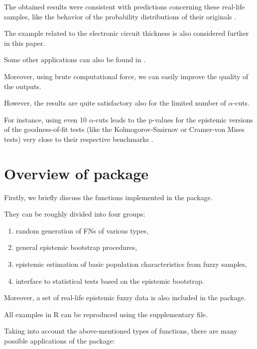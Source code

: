 The obtained results were consistent with predictions concerning these real-life samples, like the behavior of the probability distributions of their originals \citep{Gibbons2010}.

The example related to the electronic circuit thickness is also considered further in this paper.

Some other applications can also be found in \citep{10.1007/978-3-031-08974-9_39,pgmr2022,GrzegorzewskiRom2021,PGMR2024AMS}.

Moreover, using brute computational force, we can easily improve the quality of the outputs.

However, the results are quite satisfactory also for the limited number of $\alpha$-cuts.

For instance, using even 10 $\alpha$-cuts leads to the p-values for the epistemic versions of the goodness-of-fit tests (like the Kolmogorov-Smirnov or Cramer-von Mises tests) very close to their respective benchmarks \citep{PGMR2024AMS}.


\section{Overview of  package}

\label{overview}

Firstly, we briefly discuss the functions implemented in the  package.

They can be roughly divided into four groups:
\begin{enumerate}
\item random generation of FNs of various types,
\item general epistemic bootstrap procedures,
\item epistemic estimation of basic population characteristics from fuzzy samples,
\item interface to statistical tests based on the epistemic bootstrap.
\end{enumerate}

Moreover, a set of real-life epistemic fuzzy data is also included in the package.

All examples in R can be reproduced using the supplementary file.

Taking into account the above-mentioned types of functions, there are many possible applications of the  package:

